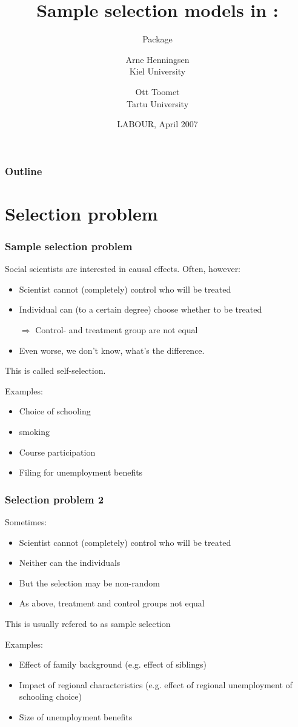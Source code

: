 \documentclass{beamer}
\title[selection models]{Sample selection models in \code{R}:}
\subtitle{Package \code{micEcon}}
\author[Henningsen\\Toomet]{
  \parbox{0.30\linewidth}{%
    Arne Henningsen\\
    Kiel University}
  \and 
  \parbox{0.30\linewidth}{%
    Ott Toomet\\
    Tartu University}}
\date{LABOUR, April 2007}
\begin{document}
\begin{frame}
  \titlepage
\end{frame}

\begin{frame}
  \frametitle{Outline}
  \tableofcontents
\end{frame}


\section[Problem]{Selection problem}

\begin{frame}
  \frametitle{Sample selection problem} 
  
  Social scientists are interested in causal effects.  Often, however:
  \begin{itemize}
  \item Scientist cannot (completely) control who will be treated
  \item Individual can (to a certain degree) choose whether to be
    treated
  \item[$\Rightarrow$] Control- and treatment group are not equal
  \item Even worse, we don't know, what's the difference.
  \end{itemize}
  This is called \alert{self-selection}.  

  \pause
  Examples:
  \begin{itemize}
  \item Choice of schooling
  \item \qquad smoking
  \item Course participation
  \item Filing for unemployment benefits
  \end{itemize}
\end{frame}

\begin{frame}
  \frametitle{Selection problem 2}
  Sometimes:
  \begin{itemize}
  \item Scientist cannot (completely) control who will be treated
  \item Neither can the individuals
  \item But the selection may be non-random
  \item As above, treatment and control groups not equal
  \end{itemize}
  This is usually refered to as \alert{sample selection}

  \pause
  Examples:
  \begin{itemize}
  \item Effect of family background (e.g. effect of siblings)
  \item Impact of regional characteristics (e.g. effect of regional
    unemployment of schooling choice)
  \item Size of unemployment benefits
  \end{itemize}
\end{frame}
\end{document}
